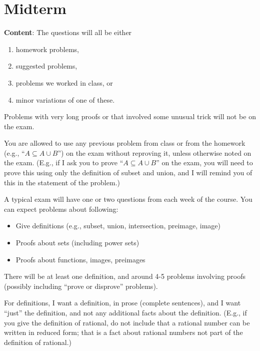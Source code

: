 \documentclass[12pt]{article}
\begin{document}
\section[ (November 17) Midterm]{Midterm}

\noindent \textbf{Content}: The questions will all be either
\begin{enumerate}
\item homework problems,
\item suggested problems,
\item problems we worked in class, or
\item minor variations of one of these.
\end{enumerate}

Problems with very long proofs or that involved some unusual trick will not be on the exam.
\smallskip

You are allowed to use any previous problem from class or from the homework (e.g., ``$A \subseteq A \cup B$'') on the exam without reproving it, unless otherwise noted on the exam. (E.g., if I ask you to prove ``$A \subseteq A \cup B$'' on the exam, you will need to prove this using only the definition of subset and union, and I will remind you of this in the statement of the problem.)
\smallskip

A typical exam will have one or two questions from each week of the course. You can expect problems about following:
\begin{itemize}
\item Give definitions (e.g., subset, union, intersection, preimage, image)
\item Proofs about sets (including power sets)
\item Proofs about functions, images, preimages
\end{itemize}
There will be at least one definition, and around 4-5 problems involving proofs (possibly including ``prove or disprove'' problems).
\smallskip


For definitions, I want a definition, in prose (complete sentences), and I want ``just'' the definition, and not any additional facts about the definition. (E.g., if you give the definition of rational, do not include that a rational number can be written in reduced form; that is a fact about rational numbers not part of the definition of rational.)
\end{document}
